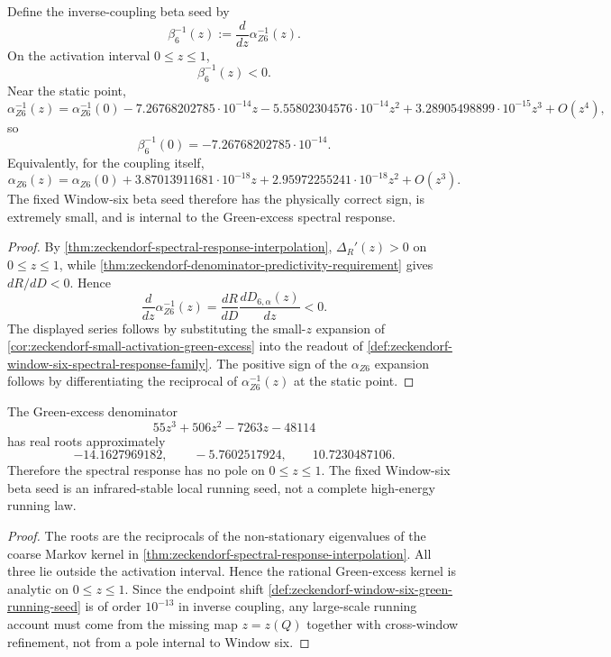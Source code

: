 \begin{theorem}
\label{thm:zeckendorf-window-six-internal-beta-seed}
Define the inverse-coupling beta seed by
$$
  \beta_6^{-1}(z)
  :=
  \frac{d}{dz}\alpha_{Z6}^{-1}(z).
$$
On the activation interval $0\leq z\leq1$,
$$
  \beta_6^{-1}(z)<0.
$$
Near the static point,
$$
  \alpha_{Z6}^{-1}(z)
  =
  \alpha_{Z6}^{-1}(0)
  -
  7.26768202785\cdot10^{-14}z
  -
  5.55802304576\cdot10^{-14}z^2
  +
  3.28905498899\cdot10^{-15}z^3
  +
  O(z^4),
$$
so
$$
  \beta_6^{-1}(0)
  =
  -7.26768202785\cdot10^{-14}.
$$
Equivalently, for the coupling itself,
$$
  \alpha_{Z6}(z)
  =
  \alpha_{Z6}(0)
  +
  3.87013911681\cdot10^{-18}z
  +
  2.95972255241\cdot10^{-18}z^2
  +
  O(z^3).
$$
The fixed Window-six beta seed therefore has the physically correct sign,
is extremely small, and is internal to the Green-excess spectral
response.
\end{theorem}
\begin{proof}
By \autoref{thm:zeckendorf-spectral-response-interpolation},
$\Delta_R'(z)>0$ on $0\leq z\leq1$, while
\autoref{thm:zeckendorf-denominator-predictivity-requirement} gives
$dR/dD<0$. Hence
$$
  \frac{d}{dz}\alpha_{Z6}^{-1}(z)
  =
  \frac{dR}{dD}
  \frac{dD_{6,\alpha}(z)}{dz}
  <
  0.
$$
The displayed series follows by substituting the small-$z$ expansion of
\autoref{cor:zeckendorf-small-activation-green-excess} into the readout
of \autoref{def:zeckendorf-window-six-spectral-response-family}. The
positive sign of the $\alpha_{Z6}$ expansion follows by differentiating
the reciprocal of $\alpha_{Z6}^{-1}(z)$ at the static point.
\end{proof}

\begin{theorem}
\label{thm:zeckendorf-window-six-beta-seed-ir-stable}
The Green-excess denominator
$$
  55z^3+506z^2-7263z-48114
$$
has real roots approximately
$$
  -14.1627969182,\qquad -5.7602517924,\qquad 10.7230487106.
$$
Therefore the spectral response has no pole on $0\leq z\leq1$. The fixed
Window-six beta seed is an infrared-stable local running seed, not a
complete high-energy running law.
\end{theorem}
\begin{proof}
The roots are the reciprocals of the non-stationary eigenvalues of the
coarse Markov kernel in
\autoref{thm:zeckendorf-spectral-response-interpolation}. All three lie
outside the activation interval. Hence the rational Green-excess kernel
is analytic on $0\leq z\leq1$. Since the endpoint shift
\autoref{def:zeckendorf-window-six-green-running-seed} is of order
$10^{-13}$ in inverse coupling, any large-scale running account must come
from the missing map $z=z(Q)$ together with cross-window refinement, not
from a pole internal to Window six.
\end{proof}

